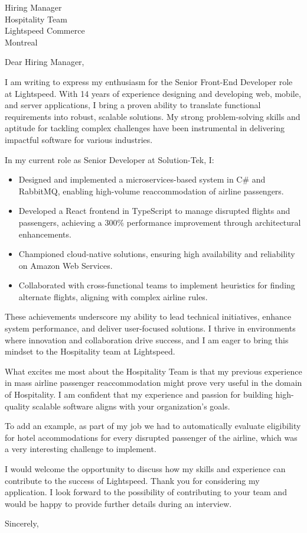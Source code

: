 \documentclass[10pt]{letter}
\begin{document}
\begin{letter}{Hiring Manager \\ Hospitality Team \\ Lightspeed Commerce \\ Montreal}  

\opening{Dear Hiring Manager,}

I am writing to express my enthusiasm for the Senior Front-End Developer role at Lightspeed. With 14 years of experience designing and developing web, mobile, and server applications, I bring a proven ability to translate functional requirements into robust, scalable solutions. My strong problem-solving skills and aptitude for tackling complex challenges have been instrumental in delivering impactful software for various industries.

In my current role as Senior Developer at Solution-Tek, I:

\begin{itemize}
  \item Designed and implemented a microservices-based system in C\# and RabbitMQ, enabling high-volume reaccommodation of airline passengers.
  \item Developed a React frontend in TypeScript to manage disrupted flights and passengers, achieving a 300\% performance improvement through architectural enhancements.
  \item Championed cloud-native solutions, ensuring high availability and reliability on Amazon Web Services.
  \item Collaborated with cross-functional teams to implement heuristics for finding alternate flights, aligning with complex airline rules.
\end{itemize}

These achievements underscore my ability to lead technical initiatives, enhance system performance, and deliver user-focused solutions. I thrive in environments where innovation and collaboration drive success, and I am eager to bring this mindset to the Hospitality team at Lightspeed.

What excites me most about the Hospitality Team is that my previous experience in mass airline passenger reaccommodation might prove very useful in the domain of Hospitality. I am confident that my experience and passion for building high-quality scalable software aligns with your organization's goals.

To add an example, as part of my job we had to automatically evaluate eligibility for hotel accommodations for every disrupted passenger of the airline, which was a very interesting challenge to implement.

I would welcome the opportunity to discuss how my skills and experience can contribute to the success of Lightspeed. Thank you for considering my application. I look forward to the possibility of contributing to your team and would be happy to provide further details during an interview.

\closing{Sincerely,}

\end{letter}
\end{document}
